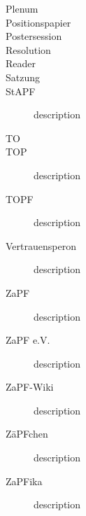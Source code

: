\begin{description}
	\item[Plenum] 
	\item[Positionspapier] 
	\item[Postersession] 
	\item[Resolution] 
	\item[Reader] 
	\item[Satzung] 
	\item[StAPF] description
	\item[TO] 
	\item[TOP] description
	\item[TOPF] description
	\item[Vertrauensperon] description
	\item[ZaPF] description
	\item[ZaPF e.V.] description
	\item[ZaPF-Wiki] description
	\item[ZäPFchen] description
	\item[ZaPFika] description
\end{description}
